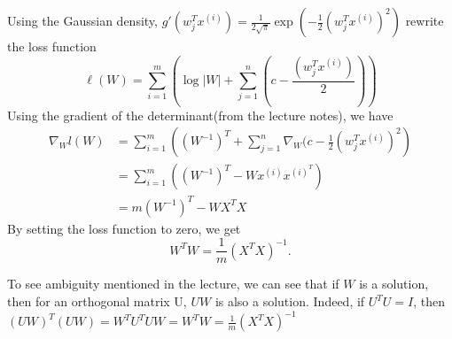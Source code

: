 \begin{answer}
    Using the Gaussian density, $g'(w^T_j x^{(i)}) = \frac{1}{2\sqrt \pi} \exp (-\frac{1}{2}(w^T_jx^{(i)})^2)$ rewrite the loss function
 $$\ell(W) = \sum_{i=1}^m\left(\log|W| + \sum_{j=1}^n (c - \frac {(w_j^Tx^{(i)})}{2})\right)
 $$  
 Using the gradient of the determinant(from the lecture notes), we have
    $$
\begin{aligned}
\nabla_Wl(W) &= \sum_{i=1}^m \left((W^{-1})^T + \sum_{j=1}^n\nabla_W(c - \frac{1}{2}(w_j^Tx^{(i)})^2\right)\\
&= \sum_{i=1}^m \left((W^{-1})^T  - Wx^{(i)}x^{(i)^T}\right)\\
&= m(W^{-1})^T - WX^TX
\end{aligned}
$$
By setting the loss function to zero, we get
$$
W^TW = \frac{1}{m}(X^TX)^{-1}.
$$

To see ambiguity mentioned in the lecture, we can see that if $W$ is a solution, then for an orthogonal matrix U, $UW$ is also a solution.
Indeed, if $U^TU = I$, then $(UW)^T(UW) = W^TU^TUW = W^TW = \frac{1}{m}(X^TX)^{-1}$

\end{answer}
